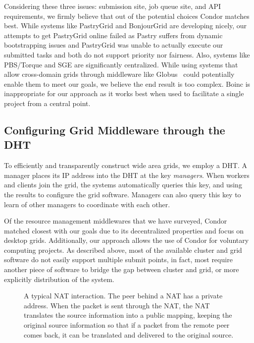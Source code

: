 \documentclass[conference]{IEEEtran}
\begin{document}
Considering these three issues:  submission site, job queue site, and API
requirements, we firmly believe that out of the potential choices Condor
matches best.  While systems like PastryGrid and BonjourGrid are developing
nicely, our attempts to get PastryGrid online failed as Pastry suffers from
dynamic bootstrapping issues and PastryGrid was unable to actually execute our
submitted tasks and both do not support priority nor fairness.  Also, systems
like PBS/Torque and SGE are significantly centralized.  While using systems
that allow cross-domain grids through middleware like Globus~\cite{globus}
could potentially enable them to meet our goals, we believe the end result is
too complex.  Boinc is inappropriate for our approach as it works best when
used to facilitate a single project from a central point.

\subsection{Configuring Grid Middleware through the DHT}
\label{condor}

To efficiently and transparently construct wide area grids, we employ a DHT.  A
manager places its IP address into the DHT at the key \emph{managers}.  When
workers and clients join the grid, the systems automatically queries this key,
and using the results to configure the grid software.  Managers can also query
this key to learn of other managers to coordinate with each other.

Of the resource management middlewares that we have surveyed, Condor matched
closest with our goals due to its decentralized properties and focus on desktop
grids.  Additionally, our approach allows the use of Condor for voluntary
computing projects.  As described above, most of the available cluster and grid
software do not easily support multiple submit points, in fact, most require
another piece of software to bridge the gap between cluster and grid, or more
explicitly distribution of the system.

\begin{figure}[h!t!]
\centering
{}
\caption{A typical NAT interaction. The peer behind a NAT has a private address.
When the packet is sent through the NAT, the NAT translates the source information
into a public mapping, keeping the original source information so that if a
packet from the remote peer comes back, it can be translated and delivered to
the original source.}
\label{fig:nat}
\end{figure}
\end{document}

